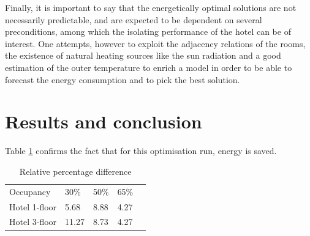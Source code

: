 \documentclass[letterpaper, 10 pt, conference]{ieeeconf}
\begin{document}
Finally, it is important to say that the energetically optimal solutions are not necessarily predictable, and are expected to be dependent on several preconditions, among which the isolating performance of the hotel can be of interest. One attempts, however to exploit the adjacency relations of the rooms, the existence of natural heating sources like the sun radiation and a good estimation of the outer temperature to enrich a model in order to be able to forecast the energy consumption and to pick the best solution.




%

 \label{state_art}%
 






\section{Results and conclusion} \label{results}
Table \ref{Table_RPD} confirms the fact that for this optimisation run, energy is saved. 

\begin{table}[htbp]
	\centering
	\caption{Relative percentage difference}
	\label{Table_RPD}
	\begin{tabular}{lllll}
		Occupancy     & 30\%  & 50\% & 65\%  \\
		Hotel 1-floor & 5.68  & 8.88 & 4.27  \\
		Hotel 3-floor & 11.27 & 8.73 & 4.27  \\
	\end{tabular}
\end{table}
\end{document}
